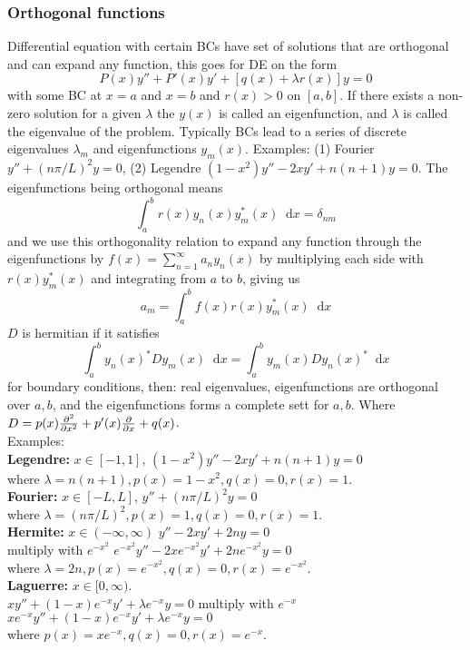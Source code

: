 \documentclass[a4paper, 10pt]{article}
\newcommand*\diff{\mathop{}\!\mathrm{d}}
\begin{document}
\begin{multicols*}{3}
\subsubsection*{Orthogonal functions}
Differential equation with certain BCs have set of solutions that are orthogonal and can expand any function, this goes for DE on the form
$$ P(x)y'' + P'(x)y' + \left[q(x) + \lambda r(x)\right]y = 0 $$
with some BC at $x=a$ and $x=b$ and $r(x)>0$ on $[a,b]$. If there exists a non-zero solution for a given $\lambda$ the $y(x)$ is called an eigenfunction, and $\lambda$ is called the eigenvalue of the problem. Typically BCs lead to a series of discrete eigenvalues $\lambda_m$ and eigenfunctions $y_m(x)$. Examples: (1) Fourier $y'' + (n\pi/L)^2y=0$, (2) Legendre $(1-x^2)y'' - 2xy'+n(n+1)y = 0$. The eigenfunctions being orthogonal means
$$ \int_a^br(x)y_n(x)y_m^*(x)\diff x = \delta_{nm} $$
and we use this orthogonality relation to expand any function through the eigenfunctions by $f(x) = \sum_{n=1}^\infty a_n y_n(x)$ by multiplying each side with $r(x)y_m^*(x)$ and integrating from $a$ to $b$, giving us
$$ a_m = \int_a^b f(x)r(x)y_m^*(x) \diff x$$
$D$ is hermitian if it satisfies
\[
\int_{a}^{b}y_n(x)^*D y_m(x) \diff x = \int_{a}^{b} y_m(x) D y_n(x)^* \diff x
\]
for boundary conditions, then: real eigenvalues, eigenfunctions are orthogonal over $a,b$, and the eigenfunctions forms a complete sett for $a,b$. Where $D= p(x)\pdv[2]{}{x}+p'(x)\pdv{}{x} +q(x)$.\\
Examples:\\
\textbf{Legendre:} $x\in[-1,1]$,
$(1-x^2)y''-2xy'+n(n+1)y=0$ \\
where $\lambda=n(n+1), p(x)=1-x^2, q(x)=0, r(x)=1$. \\
\textbf{Fourier:}  $x\in[-L,L]$,
$y''+(n\pi/L)^2y=0$\\
where $\lambda=(n \pi/L)^2, p(x)=1, q(x)=0, r(x)=1$. \\
\textbf{Hermite:} $x\in(-\infty,\infty)$
$y''-2xy'+2ny=0$ \\multiply with $e^{-x^2}$
$e^{-x^2}y''-2xe^{-x^2}y'+2ne^{-x^2}y=0$ \\
where $\lambda=2n, p(x)=e^{-x^2}, q(x)=0, r(x)=e^{-x^2}$. \\
\textbf{Laguerre:} $x\in[0,\infty)$.\\
$xy''+(1-x)e^{-x}y'+\lambda e^{-x} y=0$ multiply with $e^{-x}$\\
$xe^{-x}y''+(1-x)e^{-x}y'+\lambda e^{-x}y = 0$ \\
where $p(x)=xe^{-x}, q(x)=0, r(x)=e^{-x}$. \\


\end{multicols*}
\end{document}
